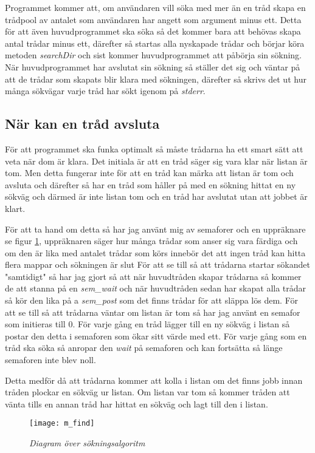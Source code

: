 \documentclass[11pt, titlepage, oneside, a4paper]{article}
\newcommand{\Subsection}[1]{\vspace{-4pt}\subsection{#1}\vspace{-8pt}}
\begin{document}
		Programmet kommer att, om användaren vill söka med mer än en tråd skapa en trådpool av antalet som användaren har angett som argument minus ett. Detta för att 
		även huvudprogrammet ska söka så det kommer bara att behövas skapa antal trådar minus ett, därefter så startas alla nyskapade trådar och börjar köra metoden \emph{searchDir}
		och sist kommer huvudprogrammet att påbörja sin sökning.
		När huvudprogrammet har avslutat sin sökning så ställer det sig och väntar på att de trådar som skapats blir klara med sökningen, därefter så skrivs det ut hur många sökvägar
		varje tråd har sökt igenom på \emph{stderr}.
		

	  
	 
		\Subsection{När kan en tråd avsluta}
		För att programmet ska funka optimalt så måste trådarna ha ett smart sätt att veta när dom är klara. Det initiala är att en tråd säger sig vara klar när listan är tom.
		Men detta fungerar inte för att en tråd kan märka att listan är tom och avsluta och därefter så har en tråd som håller på med en sökning hittat en ny sökväg och därmed är inte 
		listan tom och en tråd har avslutat utan att jobbet är klart.
		
		För att ta hand om detta så har jag använt mig av semaforer och en uppräknare se figur \ref{fig:find}, uppräknaren säger hur många trådar som anser sig 
		vara färdiga och om den är lika med antalet trådar som körs innebör det att ingen tråd kan hitta flera mappar och sökningen är slut
		För att se till så att trådarna startar sökandet "samtidigt" så har jag gjort så att när huvudtråden skapar trådarna så kommer de att stanna på en \emph{sem\_wait} och när
		huvudtråden sedan har skapat alla trådar så kör den lika på a \emph{sem\_post} som det finns trådar för att släppa lös dem.
		För att se till så att trådarna väntar om listan är tom så har jag använt en semafor som initieras till 0.
		För varje gång en tråd lägger till en ny sökväg i listan så postar den detta i semaforen som ökar sitt värde med ett.
		För varje gång som en tråd ska söka så anropar den \emph{wait} på semaforen och kan fortsätta så länge semaforen inte blev noll.
		
		Detta medför då att trådarna kommer att kolla i listan om det finns jobb innan tråden plockar en sökväg ur listan. Om listan var tom så kommer tråden att
		vänta tills en annan tråd har hittat en sökväg och lagt till den i listan.
		
		\begin{figure}[h!]
		\texttt{[image: m\_find]}
		\caption{\emph{Diagram över sökningsalgoritm}}
		\label{fig:find}
		\end{figure} 
						
\end{document}
